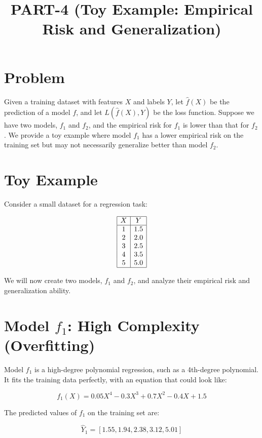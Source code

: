 \documentclass{article}
\title{PART-4 (Toy Example: Empirical Risk and Generalization)}
\author{}
\date{}
\begin{document}
\maketitle

\section*{Problem}

Given a training dataset with features \( X \) and labels \( Y \), let \( \hat{f}(X) \) be the prediction of a model \( f \), and let \( L(\hat{f}(X), Y) \) be the loss function. Suppose we have two models, \( f_1 \) and \( f_2 \), and the empirical risk for \( f_1 \) is lower than that for \( f_2 \). We provide a toy example where model \( f_1 \) has a lower empirical risk on the training set but may not necessarily generalize better than model \( f_2 \).

\section*{Toy Example}

Consider a small dataset for a regression task:

\[
\begin{array}{|c|c|}
\hline
X & Y \\
\hline
1 & 1.5 \\
2 & 2.0 \\
3 & 2.5 \\
4 & 3.5 \\
5 & 5.0 \\
\hline
\end{array}
\]

We will now create two models, \( f_1 \) and \( f_2 \), and analyze their empirical risk and generalization ability.

\section*{Model \( f_1 \): High Complexity (Overfitting)}

Model \( f_1 \) is a high-degree polynomial regression, such as a 4th-degree polynomial. It fits the training data perfectly, with an equation that could look like:

\[
f_1(X) = 0.05X^4 - 0.3X^3 + 0.7X^2 - 0.4X + 1.5
\]

The predicted values of \( f_1 \) on the training set are:

\[
\hat{Y}_1 = [1.55, 1.94, 2.38, 3.12, 5.01]
\]
\end{document}
